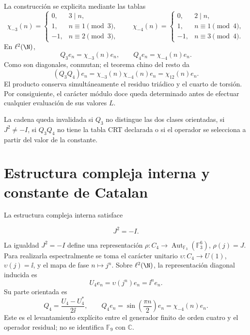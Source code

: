 La construcci\'on se explicita mediante las tablas
\begin{equation}
\chi_{-3}(n)=
\begin{cases}
0,&3\mid n,\\
1,&n\equiv1\pmod3,\\
-1,&n\equiv2\pmod3,
\end{cases}
\qquad
\chi_{-4}(n)=
\begin{cases}
0,&2\mid n,\\
1,&n\equiv1\pmod4,\\
-1,&n\equiv3\pmod4.
\end{cases}
\label{p3-83-c33-s1:eq:characters34-tables}
\end{equation}
En \(\ell^2(\N)\),
\[
Q_3e_n=\chi_{-3}(n)e_n,
\qquad Q_4e_n=\chi_{-4}(n)e_n.
\]
Como son diagonales, conmutan; el teorema chino del resto da
\begin{equation}
(Q_3Q_4)e_n=\chi_{-3}(n)\chi_{-4}(n)e_n
=\chi_{12}(n)e_n.
\label{p3-83-c33-s1:eq:q12-product-proof}
\end{equation}
El producto conserva simult\'aneamente el residuo tri\'adico y el cuarto de
torsi\'on. Por consiguiente, el car\'acter m\'odulo doce queda determinado
antes de efectuar cualquier evaluaci\'on de sus valores \(L\).

\begin{falsifier}
La cadena queda invalidada si \(Q_3\) no distingue las dos clases orientadas,
si \(J^2\ne-I\), si \(Q_3Q_4\) no tiene la tabla CRT declarada o si el
operador se selecciona a partir del valor de la constante.
\end{falsifier}

\section{Estructura compleja interna y constante de Catalan}

La estructura compleja interna satisface

\begin{equation}
J^2=-I.
\label{p3-83-c33-s1:eq:J-square}
\end{equation}

La igualdad \(J^2=-I\) define una representaci\'on
\(\rho:C_4\to\operatorname{Aut}_{\mathbb F_3}(\mathbb F_3^6)\),
\(\rho(j)=J\). Para realizarla espectralmente se toma el car\'acter unitario
\(\upsilon:C_4\to U(1)\), \(\upsilon(j)=\ii\), y el mapa de fase
\(n\mapsto j^n\). Sobre \(\ell^2(\N)\), la representaci\'on diagonal inducida
es
\[
U_4e_n=\upsilon(j^n)e_n=\ii^ne_n.
\]
Su parte orientada es
\[
Q_4=\frac{U_4-U_4^*}{2\ii},\qquad
Q_4e_n=\sin\!\left(\frac{\pi n}{2}\right)e_n
=\chi_{-4}(n)e_n.
\]
Este es el levantamiento expl\'icito entre el generador finito de orden cuatro y el operador
residual; no se identifica \(\mathbb F_9\) con \(\mathbb C\).


